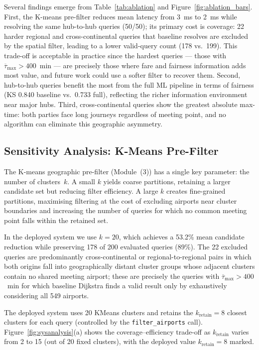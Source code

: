 \documentclass[review]{elsarticle}
\begin{document}
Several findings emerge from Table~\ref{tab:ablation} and Figure~\ref{fig:ablation_bars}.
First, the K-means pre-filter reduces mean latency from 3~ms to 2~ms while resolving the same hub-to-hub queries (50/50); its primary cost is coverage: 22 harder regional and cross-continental queries that baseline resolves are excluded by the spatial filter, leading to a lower valid-query count (178 vs.\ 199).
This trade-off is acceptable in practice since the hardest queries --- those with $\overline{\tau}_{\max}>400$~min --- are precisely those where fare and fairness information adds most value, and future work could use a softer filter to recover them.
Second, hub-to-hub queries benefit the most from the full ML pipeline in terms of fairness (KS 0.840 baseline vs.\ 0.733 full), reflecting the richer information environment near major hubs.
Third, cross-continental queries show the greatest absolute max-time: both parties face long journeys regardless of meeting point, and no algorithm can eliminate this geographic asymmetry.

\subsection{Sensitivity Analysis: K-Means Pre-Filter}
\label{sec:sensitivity}

The K-means geographic pre-filter (Module~(3)) has a single key parameter: the number of clusters~$k$.
A small $k$ yields coarse partitions, retaining a larger candidate set but reducing filter efficiency.
A large $k$ creates fine-grained partitions, maximising filtering at the cost of excluding airports near cluster boundaries and increasing the number of queries for which no common meeting point falls within the retained set.

In the deployed system we use $k = 20$, which achieves a 53.2\% mean candidate reduction while preserving 178 of 200 evaluated queries (89\%).
The 22 excluded queries are predominantly cross-continental or regional-to-regional pairs in which both origins fall into geographically distant cluster groups whose adjacent clusters contain no shared meeting airport; these are precisely the queries with $\overline{\tau}_{\max} > 400$~min for which baseline Dijkstra finds a valid result only by exhaustively considering all 549 airports.

The deployed system uses 20 KMeans clusters and retains the $k_{\text{retain}}=8$ closest clusters for each query (controlled by the \texttt{filter\_airports} call).
Figure~\ref{fig:sysanalysis}(a) shows the coverage--efficiency trade-off as $k_{\text{retain}}$ varies from 2 to 15 (out of 20 fixed clusters), with the deployed value $k_{\text{retain}}=8$ marked.
\end{document}
